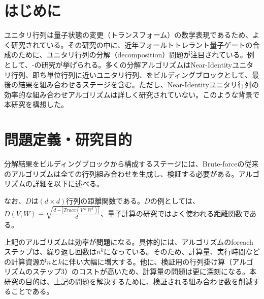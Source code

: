 \documentclass[9pt,a4paper,twocolumn]{jarticle}
\begin{document}



\section{はじめに}
ユニタリ行列は量子状態の変更（トランスフォーム）の数学表現であるため、よく研究されている。その研究の中に、近年フォールトトレラント量子ゲートの合成のために、ユニタリ行列の分解（decomposition）問題が注目されている。例として、\cite{SK:2005}-\cite{VK:2013}の研究が挙げられる。多くの分解アルゴリズムはNear-Identityユニタリ行列、即ち単位行列に近いユニタリ行列、をビルディングブロックとして、最後の結果を組み合わせるステージを含む。ただし、Near-Identityユニタリ行列の効率的な組み合わせアルゴリズムは詳しく研究されていない。このような背景で本研究を構想した。

\section{問題定義・研究目的}
分解結果をビルディングブロックから構成するステージには、Brute-forceの従来のアルゴリズムは全ての行列組み合わせを生成し、検証する必要がある。アルゴリズムの詳細を以下に述べる。


なお、$D$は$(d \times d)$行列の距離関数である。$D$の例としては、$D(V, W) \equiv \sqrt{\frac{d - |Trace(V*W^{\dagger})|}{d}}$、量子計算の研究ではよく使われる距離関数である。

上記のアルゴリズムは効率が問題になる。具体的には、アルゴリズムのforeachステップは、繰り返し回数は$n^k$になっている。そのため、計算量、実行時間などの計算資源が$n$と$k$に伴い大幅に増大する。他に、検証用の行列掛け算（アルゴリズムのステップ3）のコストが高いため、計算量の問題は更に深刻になる。本研究の目的は、上記の問題を解決するために、検証される組み合わせ数を削減することである。
\end{document}
